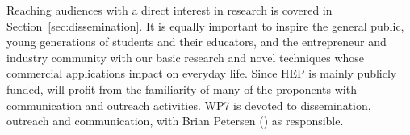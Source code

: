 






Reaching audiences with a direct interest in \acronym research
is covered in Section~\ref{sec:dissemination}. 
It is equally important to inspire 
the general public, young generations of students and
their educators, and the entrepreneur and industry community
with our basic research and novel techniques whose commercial applications %
impact on everyday life. %
Since HEP is mainly publicly funded, 
\acronym will profit from the familiarity of many of the proponents
with communication and outreach activities. 
WP7 is devoted to dissemination, outreach and communication,
with  Brian Petersen (\cern) as responsible. 

